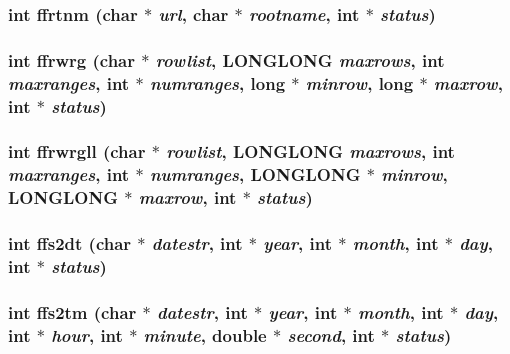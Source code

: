 \subsubsection{\setlength{\rightskip}{0pt plus 5cm}int ffrtnm (char $\ast$ {\em url}, char $\ast$ {\em rootname}, int $\ast$ {\em status})}\label{src_2fitsio_8h_3caef8f2e1fa0c29ba79cfd854862f7e}


\subsubsection{\setlength{\rightskip}{0pt plus 5cm}int ffrwrg (char $\ast$ {\em rowlist}, \bf{LONGLONG} {\em maxrows}, int {\em maxranges}, int $\ast$ {\em numranges}, long $\ast$ {\em minrow}, long $\ast$ {\em maxrow}, int $\ast$ {\em status})}\label{src_2fitsio_8h_2a49a73ce7919bc7fd5f1c3ed5bf0090}


\subsubsection{\setlength{\rightskip}{0pt plus 5cm}int ffrwrgll (char $\ast$ {\em rowlist}, \bf{LONGLONG} {\em maxrows}, int {\em maxranges}, int $\ast$ {\em numranges}, \bf{LONGLONG} $\ast$ {\em minrow}, \bf{LONGLONG} $\ast$ {\em maxrow}, int $\ast$ {\em status})}\label{src_2fitsio_8h_e997ee959852fc3d52dd2bbd9ba45819}


\subsubsection{\setlength{\rightskip}{0pt plus 5cm}int ffs2dt (char $\ast$ {\em datestr}, int $\ast$ {\em year}, int $\ast$ {\em month}, int $\ast$ {\em day}, int $\ast$ {\em status})}\label{src_2fitsio_8h_088b875388fc72d3d8ad8134a025f00c}


\subsubsection{\setlength{\rightskip}{0pt plus 5cm}int ffs2tm (char $\ast$ {\em datestr}, int $\ast$ {\em year}, int $\ast$ {\em month}, int $\ast$ {\em day}, int $\ast$ {\em hour}, int $\ast$ {\em minute}, double $\ast$ {\em second}, int $\ast$ {\em status})}\label{src_2fitsio_8h_1f6250df0ad32ae2dedecc8e87c5a0c4}


